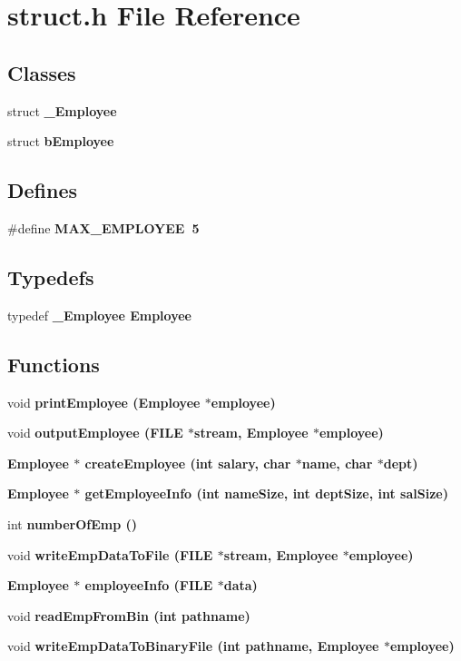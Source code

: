 \section{struct.h File Reference}
\label{struct_8h}
\subsection*{Classes}
\begin{CompactItemize}
\item 
struct \bf{\_\-Employee}
\item 
struct \bf{b\-Employee}
\end{CompactItemize}
\subsection*{Defines}
\begin{CompactItemize}
\item 
\#define \bf{MAX\_\-EMPLOYEE}~5
\end{CompactItemize}
\subsection*{Typedefs}
\begin{CompactItemize}
\item 
typedef \bf{\_\-Employee} \bf{Employee}
\end{CompactItemize}
\subsection*{Functions}
\begin{CompactItemize}
\item 
void \bf{print\-Employee} (\bf{Employee} $\ast$employee)
\item 
void \bf{output\-Employee} (FILE $\ast$stream, \bf{Employee} $\ast$employee)
\item 
\bf{Employee} $\ast$ \bf{create\-Employee} (int salary, char $\ast$name, char $\ast$dept)
\item 
\bf{Employee} $\ast$ \bf{get\-Employee\-Info} (int name\-Size, int dept\-Size, int sal\-Size)
\item 
int \bf{number\-Of\-Emp} ()
\item 
void \bf{write\-Emp\-Data\-To\-File} (FILE $\ast$stream, \bf{Employee} $\ast$employee)
\item 
\bf{Employee} $\ast$ \bf{employee\-Info} (FILE $\ast$data)
\item 
void \bf{read\-Emp\-From\-Bin} (int pathname)
\item 
void \bf{write\-Emp\-Data\-To\-Binary\-File} (int pathname, \bf{Employee} $\ast$employee)
\end{CompactItemize}


